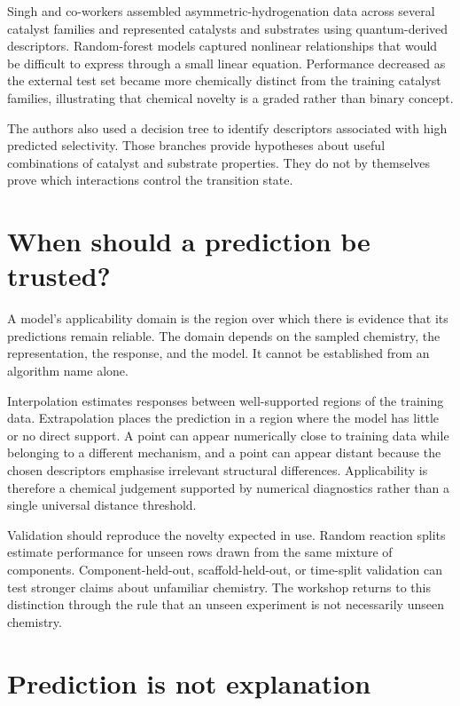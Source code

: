 Singh and co-workers assembled asymmetric-hydrogenation data across several catalyst families and represented catalysts and substrates using quantum-derived descriptors.
Random-forest models captured nonlinear relationships that would be difficult to express through a small linear equation.
Performance decreased as the external test set became more chemically distinct from the training catalyst families, illustrating that chemical novelty is a graded rather than binary concept.

The authors also used a decision tree to identify descriptors associated with high predicted selectivity.
Those branches provide hypotheses about useful combinations of catalyst and substrate properties.
They do not by themselves prove which interactions control the transition state.

\section{When should a prediction be trusted?}

A model's applicability domain is the region over which there is evidence that its predictions remain reliable.
The domain depends on the sampled chemistry, the representation, the response, and the model.
It cannot be established from an algorithm name alone.

Interpolation estimates responses between well-supported regions of the training data.
Extrapolation places the prediction in a region where the model has little or no direct support.
A point can appear numerically close to training data while belonging to a different mechanism, and a point can appear distant because the chosen descriptors emphasise irrelevant structural differences.
Applicability is therefore a chemical judgement supported by numerical diagnostics rather than a single universal distance threshold.

Validation should reproduce the novelty expected in use.
Random reaction splits estimate performance for unseen rows drawn from the same mixture of components.
Component-held-out, scaffold-held-out, or time-split validation can test stronger claims about unfamiliar chemistry.
The workshop returns to this distinction through the rule that an unseen experiment is not necessarily unseen chemistry.

\section{Prediction is not explanation}

